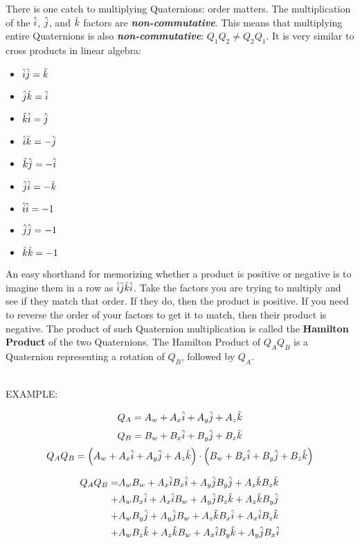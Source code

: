 There is one catch to multiplying Quaternions: order matters. The multiplication of the $\ih$, $\jh$, and $\kh$ factors are \textbf{\textit{non-commutative}}. This means that multiplying entire Quaternions is also \textbf{\textit{non-commutative}}: $Q_1Q_2 \neq Q_2Q_1$. It is very similar to cross products in linear algebra: 
\\[7.5pt]
\begin{minipage}{\textwidth}
\begin{adjustwidth}{10em}{10em}
\begin{multicols}{3}
\begin{itemize}
\item $\ih\jh=\kh$
\item $\jh\kh=\ih$
\item $\kh\ih=\jh$
\end{itemize}
\columnbreak
\begin{itemize}
\item $\ih\kh=-\jh$
\item $\kh\jh=-\ih$
\item $\jh\ih=-\kh$
\end{itemize}
\columnbreak
\begin{itemize}
\item $\ih\ih=-1$
\item $\jh\jh=-1$
\item $\kh\kh=-1$
\end{itemize}
\columnbreak
\end{multicols}
\end{adjustwidth}
\indent An easy shorthand for memorizing whether a product is positive or negative is to imagine them in a row as $\ih\jh\kh\ih$. Take the factors you are trying to multiply and see if they match that order. If they do, then the product is positive. If you need to reverse the order of your factors to get it to match, then their product is negative. The product of such Quaternion multiplication is called the \textbf{Hamilton Product} of the two Quaternions. The Hamilton Product of $Q_AQ_B$ is a Quaternion representing a rotation of $Q_B$, followed by $Q_A$.
\end{minipage}
\\[7.5pt]

EXAMPLE:

$$Q_A=A_w+A_x\ih+A_y\jh+A_z\kh$$
$$Q_B=B_w+B_x\ih+B_y\jh+B_z\kh$$
$$Q_AQ_B = \left(A_w+A_x\ih+A_y\jh+A_z\kh\right)\cdot\left(B_w+B_x\ih+B_y\jh+B_z\kh\right)$$

\begin{align*}
Q_AQ_B = 
& A_w B_w + A_x\ih B_x\ih + A_y\jh B_y\jh + A_z\kh B_z\kh\\+
& A_w B_x\ih + A_x\ih B_w + A_y\jh B_z\kh + A_z\kh B_y\jh\\+
& A_w B_y\jh + A_y\jh B_w + A_z\kh B_x\ih + A_x\ih B_z\kh\\+
& A_w B_z\kh + A_z\kh B_w + A_x\ih B_y\kh + A_y\jh B_x\ih\\
\end{align*}

